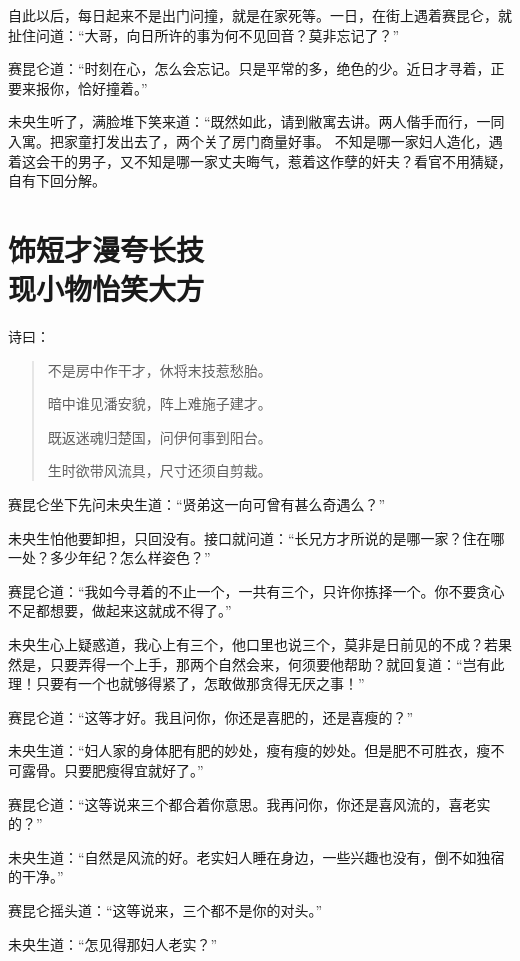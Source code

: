 \documentclass[a4paper,12pt,UTF8,twoside]{ctexbook}
\begin{document}
自此以后，每日起来不是出门问撞，就是在家死等。一日，在街上遇着赛昆仑，就扯住问道：“大哥，向日所许的事为何不见回音？莫非忘记了？”

赛昆仑道：“时刻在心，怎么会忘记。只是平常的多，绝色的少。近日才寻着，正要来报你，恰好撞着。”

未央生听了，满脸堆下笑来道：“既然如此，请到敝寓去讲。两人偕手而行，一同入寓。把家童打发出去了，两个关了房门商量好事。 不知是哪一家妇人造化，遇着这会干的男子，又不知是哪一家丈夫晦气，惹着这作孽的奸夫？看官不用猜疑，自有下回分解。

\chapter[饰短才漫夸长技\ 现小物怡笑大方]{饰短才漫夸长技\\现小物怡笑大方}

诗曰：

\begin{quotation}
不是房中作干才，休将末技惹愁胎。

暗中谁见潘安貌，阵上难施子建才。

既返迷魂归楚国，问伊何事到阳台。

生时欲带风流具，尺寸还须自剪裁。
\end{quotation}

赛昆仑坐下先问未央生道：“贤弟这一向可曾有甚么奇遇么？”

未央生怕他要卸担，只回没有。接口就问道：“长兄方才所说的是哪一家？住在哪一处？多少年纪？怎么样姿色？”

赛昆仑道：“我如今寻着的不止一个，一共有三个，只许你拣择一个。你不要贪心不足都想要，做起来这就成不得了。”

未央生心上疑惑道，我心上有三个，他口里也说三个，莫非是日前见的不成？若果然是，只要弄得一个上手，那两个自然会来，何须要他帮助？就回复道：“岂有此理！只要有一个也就够得紧了，怎敢做那贪得无厌之事！”

赛昆仑道：“这等才好。我且问你，你还是喜肥的，还是喜瘦的？”

未央生道：“妇人家的身体肥有肥的妙处，瘦有瘦的妙处。但是肥不可胜衣，瘦不可露骨。只要肥瘦得宜就好了。”

赛昆仑道：“这等说来三个都合着你意思。我再问你，你还是喜风流的，喜老实的？”

未央生道：“自然是风流的好。老实妇人睡在身边，一些兴趣也没有，倒不如独宿的干净。”

赛昆仑摇头道：“这等说来，三个都不是你的对头。”

未央生道：“怎见得那妇人老实？”
\end{document}
